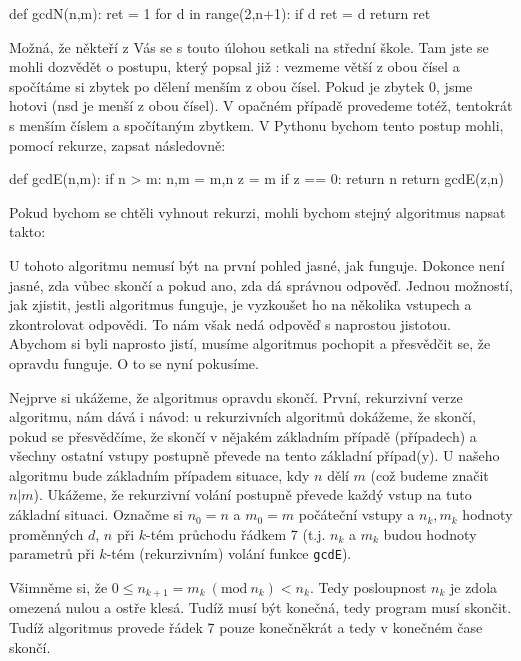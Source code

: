 \begin{python}
def gcdN(n,m):
    ret = 1
    for d in range(2,n+1):
        if d %
            ret = d
    return ret
\end{python}

Možná, že někteří z Vás se s touto úlohou setkali na střední škole. Tam jste se mohli dozvědět o postupu, který 
popsal již : vezmeme větší z obou čísel a spočítáme si zbytek po dělení menším z obou čísel. Pokud je
zbytek 0, jsme hotovi (nsd je menší z obou čísel). V opačném případě provedeme totéž, tentokrát s menším číslem 
a spočítaným zbytkem. V Pythonu bychom tento postup mohli, pomocí rekurze, zapsat následovně:

\begin{python}
def gcdE(n,m):
    if n > m:
        n,m = m,n
    z = m %
    if z == 0:
        return n
    return gcdE(z,n)
\end{python}

Pokud bychom se chtěli vyhnout rekurzi, mohli bychom stejný algoritmus napsat takto:


U tohoto algoritmu nemusí být na první pohled jasné, jak funguje. Dokonce není jasné, zda vůbec skončí a pokud ano, zda
dá správnou odpověď.  Jednou možností, jak zjistit, jestli algoritmus funguje, je vyzkoušet ho na několika vstupech a 
zkontrolovat odpovědi. To nám však nedá odpověď s naprostou jistotou.  Abychom si byli naprosto jistí, musíme
algoritmus pochopit a přesvědčit se, že opravdu funguje. O to se nyní pokusíme. 

Nejprve si ukážeme, že
algoritmus opravdu skončí.  První, rekurzivní verze algoritmu, nám dává i návod: u rekurzivních algoritmů dokážeme,
že skončí, pokud se přesvědčíme, že skončí v nějakém základním případě (případech) a všechny ostatní vstupy postupně převede
na tento základní případ(y).  U našeho algoritmu bude základním případem situace, kdy $n$ dělí $m$ (což budeme značit $n|m$).  Ukážeme, že rekurzivní volání
postupně převede každý vstup na tuto základní situaci. Označme si $n_0 = n$ a $m_0=m$ počáteční vstupy a $n_k, m_k$ hodnoty proměnných 
$d$, $n$ při $k$-tém průchodu řádkem 7 (t.j. $n_k$ a $m_k$ budou hodnoty parametrů při $k$-tém (rekurzivním) volání funkce {\tt gcdE}).

Všimněme si, že $0\leq n_{k+1} = m_k\ (\mbox{mod}\ n_k) <n_k$. Tedy posloupnost $n_k$ je zdola omezená
nulou a ostře klesá. Tudíž musí být konečná, tedy program musí skončit. Tudíž algoritmus provede řádek 7 pouze konečněkrát a tedy v konečném
čase skončí. 


